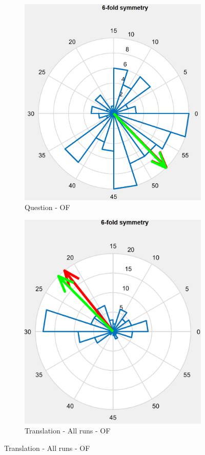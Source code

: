 \documentclass[a4paper]{article}
\begin{document}
\begin{figure}[h]
\begin{subfigure}[b]{0.3\textwidth}
        \includegraphics[width=\linewidth]{alignment_question_OF.png}
        \caption{Question - OF}
        \label{fig:alignment_ques_OF}
    \end{subfigure}
    \hfill
    \begin{subfigure}[b]{0.3\textwidth}
        \includegraphics[width=\linewidth]{alignment_trans_ALL_OF.png}
        \caption{Translation - All runs - OF}
        \label{fig:alignment_trans_ALL_OF}
    \end{subfigure}
    

\end{figure}
\end{document}
